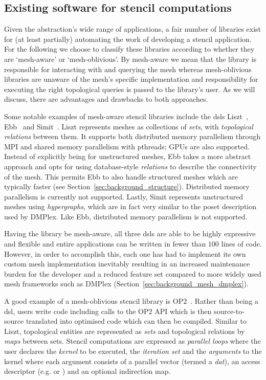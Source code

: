 \subsection{Existing software for stencil computations}
\label{sec:stencillang}

Given the abstraction's wide range of applications, a fair number of libraries exist for (at least partially) automating the work of developing a stencil application.
For the following we choose to classify these libraries according to whether they are `mesh-aware' or `mesh-oblivious'.
By mesh-aware we mean that the library is responsible for interacting with and querying the mesh whereas mesh-oblivious libraries are unaware of the mesh's specific implementation and responsibility for executing the right topological queries is passed to the library's user.
As we will discuss, there are advantages and drawbacks to both approaches.

Some notable examples of mesh-aware stencil libraries include the \glspl{dsl} Liszt~\cite{devitoLisztDomainSpecific2011}, Ebb~\cite{bernsteinEbbDSLPhysical2016} and Simit~\cite{kjolstadSimitLanguagePhysical2016}.
Liszt represents meshes as collections of \textit{sets}, with \textit{topological relations} between them.
It supports both distributed memory parallelism through MPI and shared memory parallelism with pthreads; GPUs are also supported.
Instead of explicitly being for unstructured meshes, Ebb takes a more abstract approach and opts for using database-style \textit{relations} to describe the connectivity of the mesh.
This permits Ebb to also handle structured meshes which are typically faster (see Section~\ref{sec:background_structure}).
Distributed memory parallelism is currently not supported.
Lastly, Simit represents unstructured meshes using \textit{hypergraphs}, which are in fact very similar to the \gls{poset} description used by DMPlex.
Like Ebb, distributed memory parallelism is not supported.

Having the library be mesh-aware, all three \glspl{dsl} are able to be highly expressive and flexible and entire applications can be written in fewer than 100 lines of code.
However, in order to accomplish this, each one has had to implement its own custom mesh implementation inevitably resulting in an increased maintenance burden for the developer and a reduced feature set compared to more widely used mesh frameworks such as DMPlex (Section~\ref{sec:background_mesh_dmplex}).

A good example of a mesh-oblivious stencil library is OP2~\cite{mudaligeOP2ActiveLibrary2012,mudaligeDesignInitialPerformance2013}.
Rather than being a \gls{dsl}, users write code including calls to the OP2 API which is then source-to-source translated into optimised code which can then be compiled.
Similar to Liszt, topological entities are represented as \textit{sets} and topological relations by \textit{maps} between sets.
Stencil computations are expressed as \textit{parallel loops} where the user declares the \textit{kernel} to be executed, the \textit{iteration set} and the \textit{arguments} to the kernel where each argument consists of a parallel vector (termed a \textit{dat}), an access descriptor (e.g.  or ) and an optional indirection map.

